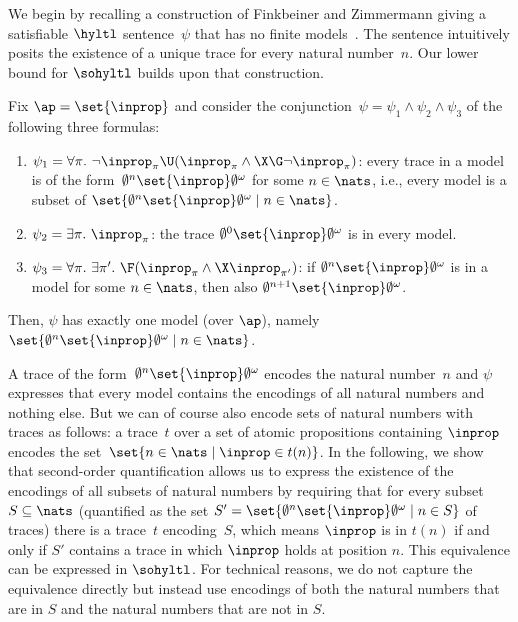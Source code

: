 \begin{exa}
\label{example_hyltlcardlb}
We begin by recalling a construction of Finkbeiner and Zimmermann giving a satisfiable $\hyltl$ sentence~$\psi$ that has no finite models~\cite{FZ17}.
The sentence intuitively posits the existence of a unique trace for every natural number~$n$. Our lower bound for $\sohyltl$ builds upon that construction.

Fix $\ap=\set{\inprop}$ and consider the conjunction~$\psi = \psi_1 \wedge \psi_2 \wedge \psi_3$ of the following three formulas:
\begin{enumerate}
    \item $\psi_1 = \forall \pi.\ \neg \inprop_\pi \U ( \inprop_\pi \wedge \X \G \neg \inprop_\pi ) $: every trace in a model is of the form~$\emptyset^n \set{\inprop} \emptyset^\omega$ for some $n \in\nats$, i.e., every model is a subset of $\set{\emptyset^n \set{\inprop} \emptyset^\omega \mid n\in\nats}$. 
    
    \item $\psi_2 = \exists\pi.\ \inprop_\pi$: the trace $\emptyset^0 \set{\inprop} \emptyset^\omega$ is in every model.
    
    \item $\psi_3 = \forall \pi.\ \exists\pi'.\ \F (\inprop_\pi \wedge \X \inprop_{\pi'})$: if $\emptyset^n \set{\inprop} \emptyset^\omega$ is in a model for some $n\in\nats$, then also $\emptyset^{n+1} \set{\inprop} \emptyset^\omega$.
    
\end{enumerate}
Then, $\psi$ has exactly one model (over $\ap$), namely $\set{\emptyset^n \set{\inprop} \emptyset^\omega \mid n\in\nats}$.
\end{exa}

A trace of the form~$\emptyset^n \set{\inprop} \emptyset^\omega $ encodes the natural number~$n$ and $\psi$ expresses that every model contains the encodings of all natural numbers and nothing else.
But we can of course also encode sets of natural numbers with traces as follows: a trace~$t$ over a set of atomic propositions containing $\inprop$ encodes the set~$\set{n \in \nats \mid \inprop \in t(n)}$. 
In the following, we show that second-order quantification allows us to express the existence of the encodings of all subsets of natural numbers by requiring that for every subset~$S \subseteq \nats$ (quantified as the set $S' = \set{\emptyset^n \set{\inprop} \emptyset^\omega \mid n\in S}$ of traces) there is a trace~$t$ encoding~$S$, which means $\inprop$ is in $t(n)$ if and only if $S'$ contains a trace in which $\inprop$ holds at position $n$.
This equivalence can be expressed in $\sohyltl$.
For technical reasons, we do not capture the equivalence directly but instead use encodings of both the natural numbers that are in $S$ and the natural numbers that are not in $S$.

